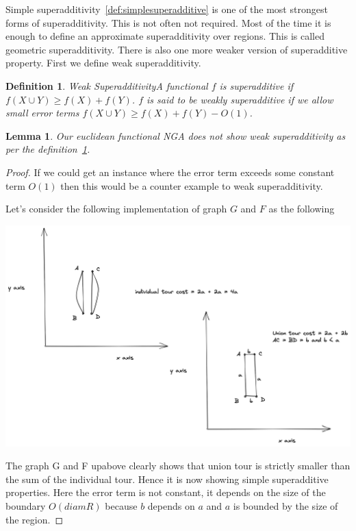 \documentclass{article}
\theoremstyle{define}
\newtheorem{define}{Definition}[section]
\newtheorem{lemma}[theorem]{Lemma}
\theoremstyle{remark}
\begin{document}
Simple superadditivity~\ref{def:simplesuperadditive} is one of the most strongest forms of
superadditivity. This is not often not required. Most of the time it is enough
to define an approximate superadditivity over regions. This is called geometric
superadditivity. There is also one more weaker version of superadditive
property. First we define weak superadditivity.

\begin{define}{Weak Superadditivity}\label{def:weaksuperadditive}
    A functional $f$ is superadditive if $f(X \cup Y) \ge f(X) + f(Y) $.
    $f$ is said to be weakly superadditive if we allow small error terms
    $f(X \cup Y) \ge f(X) + f(Y) - O(1)$.
\end{define}

\begin{lemma}
    Our euclidean functional \textsf{NGA} does not show weak superadditivity as per the definition~\ref{def:weaksuperadditive}.
\end{lemma}

\begin{proof}
    If we could get an instance where the error term exceeds some constant term $O(1)$
    then this would be a counter example to weak superadditivity.

    Let's consider the following implementation of graph $G$ and $F$ as the following
    
    \includegraphics[scale=0.17]{simple-superadditive.png}

    The graph G and F upabove clearly shows that union tour is strictly smaller than the sum of the individual tour.
    Hence it is now showing simple superadditive properties. Here the error term is not constant, it depends on the size
    of the boundary $O(diam R)$ because $b$ depends on $a$ and $a$ is bounded by the size of the region.
\end{proof}
\end{document}
